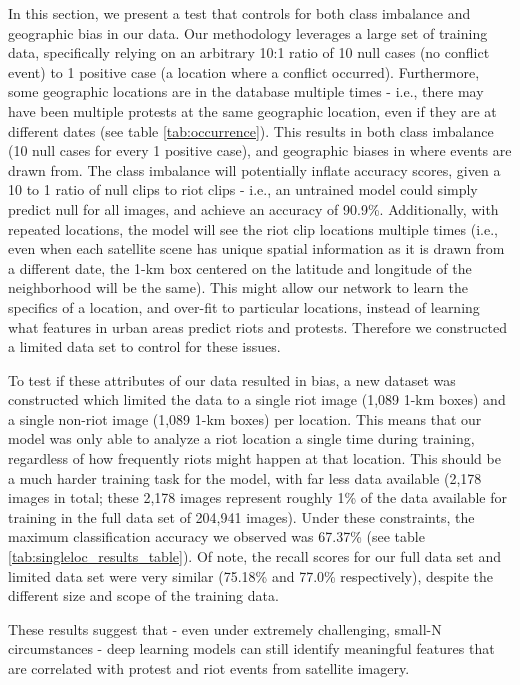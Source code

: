 In this section, we present a test that controls for both class imbalance and geographic bias in our data. Our methodology leverages a large set of training data, specifically relying on an arbitrary 10:1 ratio of 10 null cases (no conflict event) to 1 positive case (a location where a conflict occurred).  Furthermore, some geographic locations are in the database multiple times - i.e., there may have been multiple protests at the same geographic location, even if they are at different dates (see table \ref{tab:occurrence}).  This results in both class imbalance (10 null cases for every 1 positive case), and geographic biases in where events are drawn from.  The class imbalance will potentially inflate accuracy scores, given a 10 to 1 ratio of null clips to riot clips - i.e., an untrained model could simply predict null for all images, and achieve an accuracy of 90.9\%.  Additionally, with repeated locations, the model will see the riot clip locations multiple times (i.e., even when each satellite scene has unique spatial information as it is drawn from a different date, the 1-km box centered on the latitude and longitude of the neighborhood will be the same).  This might allow our network to learn the specifics of a location, and over-fit to particular locations, instead of learning what features in urban areas predict riots and protests.  Therefore we constructed a limited data set to control for these issues.

To test if these attributes of our data resulted in bias, a new dataset was constructed which limited the data to a single riot image (1,089 1-km boxes) and a single non-riot image (1,089 1-km boxes) per location.  This means that our model was only able to analyze a riot location a single time during training, regardless of how frequently riots might happen at that location.  This should be a much harder training task for the model, with far less data available (2,178 images in total; these 2,178 images represent roughly 1\% of the data available for training in the full data set of 204,941 images).  Under these constraints, the maximum classification accuracy we observed was 67.37\% (see table \ref{tab:singleloc_results_table}).  Of note, the recall scores for our full data set and limited data set were very similar (75.18\% and 77.0\% respectively), despite the different size and scope of the training data.  

These results suggest that - even under extremely challenging, small-N circumstances - deep learning models can still identify meaningful features that are correlated with protest and riot events from satellite imagery.  


